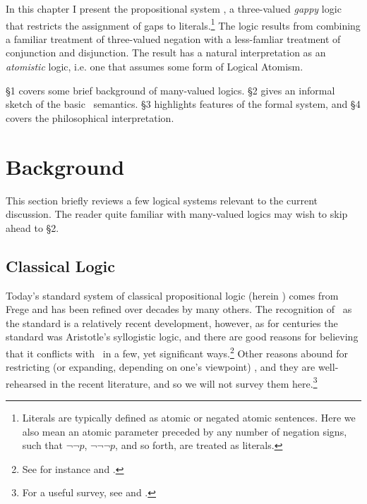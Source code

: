 





%


	In this chapter I present the propositional system \GO, a three-valued \emph{gappy} logic that restricts the assignment of gaps to literals.\footnote{Literals are typically defined as atomic or negated atomic sentences. Here we also mean an atomic parameter preceded by any number of negation signs, such that $\neg\neg p$, $\neg\neg\neg p$, and so forth, are treated as literals.} The logic results from combining a familiar treatment of three-valued negation with a less-famliar treatment of conjunction and disjunction. The result has a natural interpretation as an \emph{atomistic} logic, i.e. one that assumes some form of Logical Atomism.
	
	\S 1 covers some brief background of many-valued logics. \S 2 gives an informal sketch of the basic \GO\ semantics. \S 3 highlights features of the formal system, and \S 4 covers the philosophical interpretation.

	\section{Background}\label{background}
	This section briefly reviews a few logical systems relevant to the current discussion. The reader quite familiar with many-valued logics may wish to skip ahead to \S 2.
	
	\subsection{Classical Logic}\label{classicalLogic}
	Today's standard system of classical propositional logic (herein \CPL) comes from Frege and has been refined over decades by many others. The recognition of \CPL\ as the standard is a relatively recent development, however, as for centuries the standard was Aristotle's syllogistic logic, and there are good reasons for believing that it conflicts with \CPL\ in a few, yet significant ways.\footnote{See for instance \cite{Luk1957} and \cite{Corcoran1972}.} Other reasons abound for restricting (or expanding, depending on one's viewpoint) \CPL, and they are well-rehearsed in the recent literature, and so we will not survey them here.\footnote{For a useful survey, see \cite{Rescher1969} and \cite{Beall:2003}.}
	
